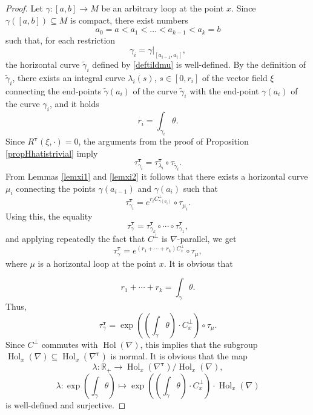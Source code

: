 \documentclass[10pt,a4paper]{amsart}
\newcommand{\Hol}{\operatorname{Hol}}
\newcommand{\Real}{\mathbb{R}}
\newcommand{\bt}{{\boldsymbol{\tau}}}
\begin{document}
\begin{proof}
Let $\gamma:[a,b]\to M$ be an arbitrary loop at the point $x$.
Since $\gamma([a,b])\subseteq M$ is compact, there exist
numbers $$a_0=a< a_1<\dots< a_{k-1}<a_k=b$$ such that,
for each restriction
$$\gamma_i=\gamma|_{[a_{i-1},a_i]},$$ the horizontal curve $\tilde \gamma_i$ defined by \eqref{deftildmu} is well-defined. 
By the definition of $\tilde\gamma_i$, there exists an integral curve $\lambda_i(s)$, $s\in [0,r_i]$ of the vector field $\xi$ connecting the end-points $\tilde\gamma(a_i)$ of the curve $\tilde\gamma_i$ with the end-point $\gamma(a_i)$ of the curve $\gamma_i$, and it holds 
$$r_i= \int_{\gamma_i}\theta.$$
Since $R^\bt(\xi,\cdot)=0$,  
the arguments from the proof of Proposition \ref{propHhatistrivial} imply
$$\tau^\bt_{\gamma_i}=\tau^\bt_{\lambda_i}\circ \tau_{\tilde\gamma_i}.$$
From Lemmas \ref{lemxi1} and \ref{lemxi2} it follows that there exists a horizontal curve $\mu_i$ connecting the points $\gamma(a_{i-1})$ and $\gamma(a_i)$ such that 
$$\tau^\bt_{\gamma_i}=e^{r_iC^\bot_{\gamma(a_i)}}\circ\tau_{\mu_i}.$$
Using this, the equality
$$\tau^\bt_\gamma=\tau^\bt_{\gamma_k}\circ\cdots\circ\tau^\bt_{\gamma_1},$$
and applying repeatedly the fact that $C^\bot$ is $\nabla$-parallel, we get 
$$\tau^\bt_\gamma=e^{(r_1+\cdots +r_k)C^\bot_x}\circ\tau_{\mu},$$
where $\mu$ is a horizontal loop at the point $x$.
It is obvious that 

$$r_1+\cdots +r_k=\int_\gamma\theta.$$
Thus, $$\tau^\bt_\gamma=\exp\left(\left(\int_\gamma\theta\right)\cdot {C^\bot_x}\right)\circ\tau_{\mu}.$$
Since
$C^\perp$ commutes with $\Hol(\nabla)$, this implies that the subgroup $\Hol_x(\nabla)\subseteq\Hol_x(\nabla^\bt)$ is normal. It is obvious that the map
$$\lambda:\Real_+\to\Hol_x(\nabla^\bt)/\Hol_x(\nabla),$$
$$\lambda:\exp\left(\int_\gamma\theta\right)\mapsto
\exp\left(\left(\int_\gamma\theta\right)\cdot {C^\bot_x}\right)\cdot \Hol_x(\nabla)$$
is well-defined and surjective. \end{proof}
\end{document}
